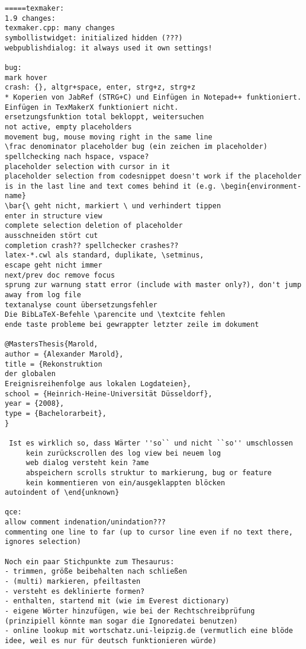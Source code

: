 \documentclass[10pt,a4paper,landscape]{report}
\begin{document}
\begin{verbatim}
=====texmaker: 
1.9 changes:
texmaker.cpp: many changes
symbollistwidget: initialized hidden (???)
webpublishdialog: it always used it own settings!

bug: 
mark hover
crash: {}, altgr+space, enter, strg+z, strg+z
* Koperien von JabRef (STRG+C) und Einfügen in Notepad++ funktioniert. Einfügen in TexMakerX funktioniert nicht.
ersetzungsfunktion total bekloppt, weitersuchen
not active, empty placeholders
movement bug, mouse moving right in the same line
\frac denominator placeholder bug (ein zeichen im placeholder)
spellchecking nach hspace, vspace?
placeholder selection with cursor in it
placeholder selection from codesnippet doesn't work if the placeholder is in the last line and text comes behind it (e.g. \begin{environment-name}
\bar{\ geht nicht, markiert \ und verhindert tippen
enter in structure view
complete selection deletion of placeholder
ausschneiden stört cut
completion crash?? spellchecker crashes??
latex-*.cwl als standard, duplikate, \setminus, 
escape geht nicht immer
next/prev doc remove focus
sprung zur warnung statt error (include with master only?), don't jump away from log file
textanalyse count übersetzungsfehler
Die BibLaTeX-Befehle \parencite und \textcite fehlen
ende taste probleme bei gewrappter letzter zeile im dokument

@MastersThesis{Marold,
author = {Alexander Marold},
title = {Rekonstruktion 
der globalen 
Ereignisreihenfolge aus lokalen Logdateien},
school = {Heinrich-Heine-Universität Düsseldorf},
year = {2008},
type = {Bachelorarbeit},
}

 Ist es wirklich so, dass Wärter ''so`` und nicht ``so'' umschlossen
     kein zurückscrollen des log view bei neuem log
     web dialog versteht kein ?ame
     abspeichern scrolls struktur to markierung, bug or feature
     kein kommentieren von ein/ausgeklappten blöcken
autoindent of \end{unknown}

qce:
allow comment indenation/unindation???
commenting one line to far (up to cursor line even if no text there, ignores selection)

Noch ein paar Stichpunkte zum Thesaurus:
- trimmen, größe beibehalten nach schließen
- (multi) markieren, pfeiltasten
- versteht es deklinierte formen?
- enthalten, startend mit (wie im Everest dictionary)
- eigene Wörter hinzufügen, wie bei der Rechtschreibprüfung (prinzipiell könnte man sogar die Ignoredatei benutzen)
- online lookup mit wortschatz.uni-leipzig.de (vermutlich eine blöde idee, weil es nur für deutsch funktionieren würde)


\end{verbatim}
\end{document}
